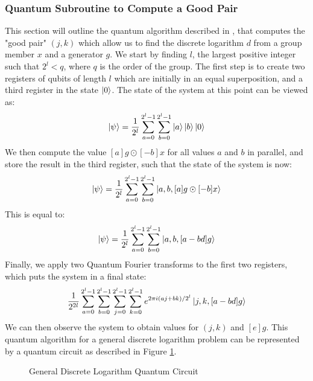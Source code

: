 \subsubsection{Quantum Subroutine to Compute a Good Pair}
This section will outline the quantum algorithm described in \cite{ekeraa2016modifying}, that computes the "good pair" $(j,k)$ which allow us to find the discrete logarithm $d$ from a group member $x$ and a generator $g$. We start by finding $l$, the largest positive integer such that $2^l < q$, where $q$ is the order of the group. The first step is to create two registers of qubits of length $l$ which are initially in an equal superposition, and a third register in the state $\ket{0}$. The state of the system at this point can be viewed as: 
$$\ket{\psi} = \frac{1}{2^l}\sum_{a=0}^{2^l-1}\sum_{b=0}^{2^l-1}\ket{a}\ket{b}\ket{0}$$
We then compute the value $[a]g\odot[-b]x$ for all values $a$ and $b$ in parallel, and store the result in the third register, such that the state of the system is now: 
$$\ket{\psi} = \frac{1}{2^l}\sum_{a=0}^{2^l-1}\sum_{b=0}^{2^l-1}\ket{a,b,[a]g\odot[-b]x}$$ This is equal to:
$$\ket{\psi} = \frac{1}{2^l}\sum_{a=0}^{2^l-1}\sum_{b=0}^{2^l-1}\ket{a,b,[a-bd]g}$$
Finally, we apply two Quantum Fourier transforms to the first two registers, which puts the system in a final state:
$$\frac{1}{2^{2l}}\sum_{a=0}^{2^l-1}\sum_{b=0}^{2^l-1}\sum_{j=0}^{2^l-1}\sum_{k=0}^{2^l-1}e^{2\pi i(aj+bk)/2^l}\ket{j,k,[a-bd]g}$$ We can then observe the system to obtain values for $(j,k)$ and $[e]g$. 
This quantum algorithm for a general discrete logarithm problem can be represented by a quantum circuit as described in Figure \ref{fig:generalDLCircuit}.
\begin{figure}[!htb]
\centering
\resizebox{\linewidth}{!}{}
\caption{General Discrete Logarithm Quantum Circuit}
\label{fig:generalDLCircuit}
\end{figure}

